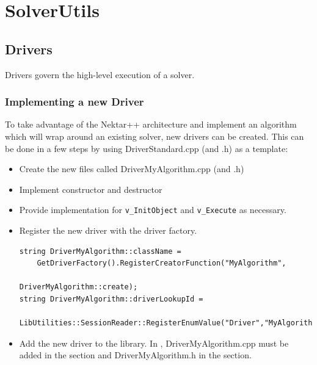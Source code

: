 \section{SolverUtils}

\subsection{Drivers}
Drivers govern the high-level execution of a solver.

\subsubsection{Implementing a new Driver}
To take advantage of the Nektar++ architecture and implement an algorithm 
which will wrap around an existing solver, new drivers can be created. This can
be done in a few steps by using DriverStandard.cpp (and .h) as a template:
\begin{itemize}
\item Create the new files called DriverMyAlgorithm.cpp (and .h)
\item Implement constructor and destructor
\item Provide implementation for \texttt{v\_InitObject} and \texttt{v\_Execute}
as necessary.
\item Register the new driver with the driver factory.
\begin{lstlisting}[style=C++Style]
string DriverMyAlgorithm::className = 
    GetDriverFactory().RegisterCreatorFunction("MyAlgorithm",
                                               DriverMyAlgorithm::create); 
string DriverMyAlgorithm::driverLookupId = 
    LibUtilities::SessionReader::RegisterEnumValue("Driver","MyAlgorithm",0);
\end{lstlisting}
\item Add the new driver to the library. In , 
DriverMyAlgorithm.cpp must be added in the  
section and DriverMyAlgorithm.h in the  section.
\end{itemize}